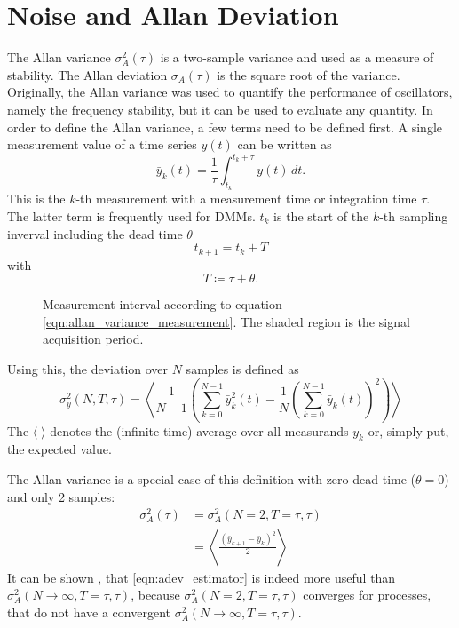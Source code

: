 \section{Noise and Allan Deviation}%
\label{sec:allan_deviation}
The Allan variance \cite{adev} $\sigma_A^2(\tau)$ is a two-sample variance and used as a measure of stability. The Allan deviation $\sigma_A(\tau)$ is the square root of the variance. Originally, the Allan variance was used to quantify the performance of oscillators, namely the frequency stability, but it can be used to evaluate any quantity. In order to define the Allan variance, a few terms need to be defined first. A single measurement value of a time series $y(t)$ can be written as
\begin{equation}
    \bar y_k(t) = \frac{1}{\tau} \int_{t_{k}}^{t_{k}+\tau} y(t)\,dt . \label{eqn:allan_variance_measurement}
\end{equation}
This is the $k$-th measurement with a measurement time or integration time $\tau$. The latter term is frequently used for DMMs. $t_k$ is the start of the $k$-th sampling inverval including the dead time $\theta$
\begin{equation}
    t_{k+1} = t_k + T
\end{equation}
with
\begin{equation}
    T \coloneqq \tau + \theta .
\end{equation}

\begin{figure}[hb]
    \centering
    \caption{Measurement interval according to equation \ref{eqn:allan_variance_measurement}. The shaded region is the signal acquisition period.}
    \label{fig:allan_variance_definitions}
\end{figure}

Using this, the deviation over $N$ samples is defined as \cite{adev,psd_to_adev}
\begin{equation}
    \sigma_y^2(N,T,\tau) = \left\langle \frac{1}{N-1} \left(\sum _{k=0}^{N-1}\bar y_k^2(t)-\frac{1}{N}\left(\sum _{k=0}^{N-1} \bar y_k(t)\right)^2\right)\right\rangle
\end{equation}
The $\langle \; \rangle$ denotes the (infinite time) average over all measurands $y_k$ or, simply put, the expected value.

The Allan variance is a special case of this definition with zero dead-time ($\theta=0$) and only 2 samples:
\begin{align}
    \sigma_A^2(\tau) &= \sigma_A^2(N=2,T=\tau,\tau) \label{eqn:allan_coefficients}\\
    &= \left\langle \frac{\left(\bar y_{k+1} - \bar y_k \right)^2}{2} \right\rangle
\end{align}
It can be shown \cite{psd_to_adev}, that \ref{eqn:adev_estimator} is indeed more useful than $\sigma_A^2(N\to\infty,T=\tau,\tau)$, because $\sigma_A^2(N=2,T=\tau,\tau)$ converges for processes, that do not have a convergent $\sigma_A^2(N\to\infty,T=\tau,\tau)$.

